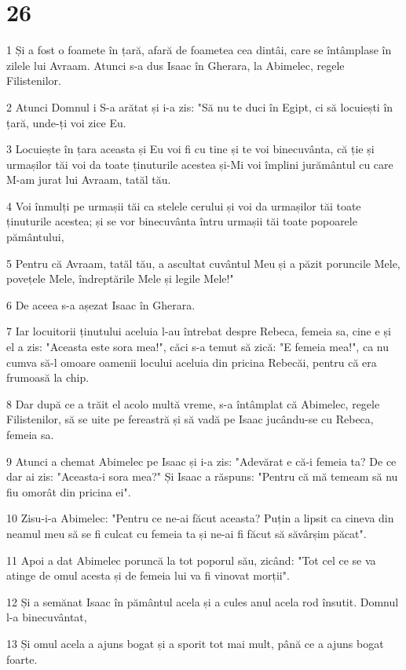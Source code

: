 \chapter{26}

\par 1 Și a fost o foamete în țară, afară de foametea cea dintâi, care se întâmplase în zilele lui Avraam. Atunci s-a dus Isaac în Gherara, la Abimelec, regele Filistenilor.
\par 2 Atunci Domnul i S-a arătat și i-a zis: "Să nu te duci în Egipt, ci să locuiești în țară, unde-ți voi zice Eu.
\par 3 Locuiește în țara aceasta și Eu voi fi cu tine și te voi binecuvânta, că ție și urmașilor tăi voi da toate ținuturile acestea și-Mi voi împlini jurământul cu care M-am jurat lui Avraam, tatăl tău.
\par 4 Voi înmulți pe urmașii tăi ca stelele cerului și voi da urmașilor tăi toate ținuturile acestea; și se vor binecuvânta întru urmașii tăi toate popoarele pământului,
\par 5 Pentru că Avraam, tatăl tău, a ascultat cuvântul Meu și a păzit poruncile Mele, povețele Mele, îndreptările Mele și legile Mele!"
\par 6 De aceea s-a așezat Isaac în Gherara.
\par 7 Iar locuitorii ținutului aceluia l-au întrebat despre Rebeca, femeia sa, cine e și el a zis: "Aceasta este sora mea!", căci s-a temut să zică: "E femeia mea!", ca nu cumva să-l omoare oamenii locului aceluia din pricina Rebecăi, pentru că era frumoasă la chip.
\par 8 Dar după ce a trăit el acolo multă vreme, s-a întâmplat că Abimelec, regele Filistenilor, să se uite pe fereastră și să vadă pe Isaac jucându-se cu Rebeca, femeia sa.
\par 9 Atunci a chemat Abimelec pe Isaac și i-a zis: "Adevărat e că-i femeia ta? De ce dar ai zis: "Aceasta-i sora mea?" Și Isaac a răspuns: "Pentru că mă temeam să nu fiu omorât din pricina ei".
\par 10 Zisu-i-a Abimelec: "Pentru ce ne-ai făcut aceasta? Puțin a lipsit ca cineva din neamul meu să se fi culcat cu femeia ta și ne-ai fi făcut să săvârșim păcat".
\par 11 Apoi a dat Abimelec poruncă la tot poporul său, zicând: "Tot cel ce se va atinge de omul acesta și de femeia lui va fi vinovat morții".
\par 12 Și a semănat Isaac în pământul acela și a cules anul acela rod însutit. Domnul l-a binecuvântat,
\par 13 Și omul acela a ajuns bogat și a sporit tot mai mult, până ce a ajuns bogat foarte.
